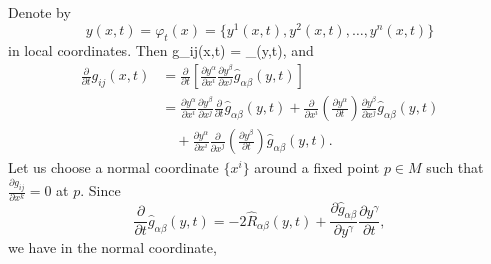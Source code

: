 Denote by
$$
y(x,t)=\varphi_t(x)=\{y^1(x,t),y^2(x,t),\ldots,y^n(x,t)\}
$$
in local coordinates. Then \be g_{ij}(x,t) = _{\alpha\beta}(y,t),
\ee and
\begin{align*}
\frac{\partial}{\partial t}g_{ij}(x,t) & =\frac{\partial}{\partial
t}\left[\frac{\partial y^\alpha}{\partial x^i}\frac{\partial
y^\beta}{\partial x^j}
\hat{g}_{\alpha\beta}(y,t)\right]\\
&  = \frac{\partial y^\alpha}{\partial x^i} \frac{\partial
y^\beta}{\partial x^j}\frac{\partial}{\partial t}
\hat{g}_{\alpha\beta}(y,t)+\frac{\partial}{\partial x^i}
\left(\frac{\partial y^\alpha}{\partial t}\right)
\frac{\partial y^\beta}{\partial x^j}\hat{g}_{\alpha\beta}(y,t)\\
&\quad +\frac{\partial y^\alpha}{\partial x^i}
\frac{\partial}{\partial x^j}\left(\frac{\partial
y^\beta}{\partial t}\right) \hat{g}_{\alpha\beta}(y,t).
\end{align*}
Let us choose a normal coordinate $\{x^i\}$ around a fixed point
$p\in M$ such that $\frac{\partial g_{ij}}{\partial x^k}=0$ at
$p$. Since
$$
\frac{\partial}{\partial t}\hat{g}_{\alpha\beta}(y,t)
=-2\hat{R}_{\alpha\beta}(y,t)+\frac{\partial
\hat{g}_{\alpha\beta}}{\partial y^\gamma}\frac{\partial
y^\gamma}{\partial t} ,
$$
we have in the normal coordinate,
